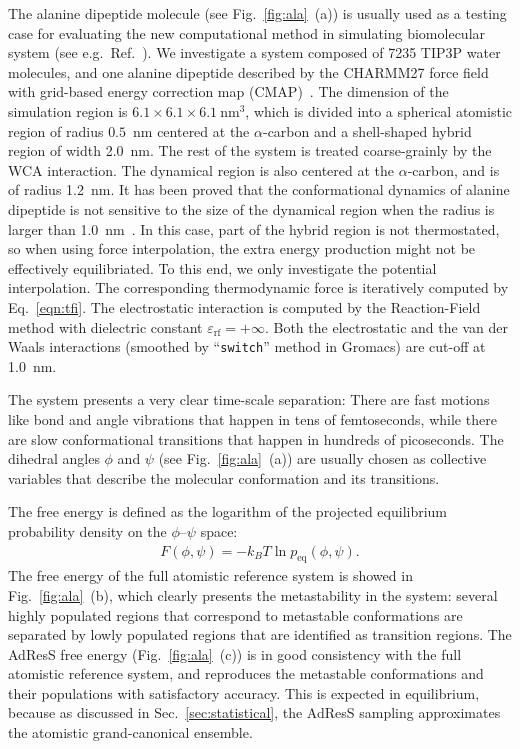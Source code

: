 \documentclass[epjST]{svjour}
\newcommand{\equi}{{\textrm{eq}}}
\begin{document}
The alanine dipeptide molecule (see Fig.~\ref{fig:ala}~(a)) is usually
used as a testing case for evaluating the new computational method in simulating 
biomolecular system (see e.g.~Ref.~\cite{apostolakis1999calculation,chodera2007automatic,kaminsky2007force,gfeller2007complex}).
We investigate a system composed of
7235 TIP3P water molecules, and
one alanine dipeptide described by the CHARMM27 force field~\cite{foloppe2000all} with
grid-based energy correction map (CMAP)~\cite{mackerell2004extending}. 
The dimension of the simulation region is $6.1\times6.1\times6.1~\textrm{nm}^3$, which is divided into
a spherical atomistic region of radius  $0.5$~nm centered at the $\alpha$-carbon and a  shell-shaped hybrid region of width 2.0~nm.
The rest of the system is treated coarse-grainly by the WCA interaction.
The dynamical region  is
also centered at the $\alpha$-carbon, and is of radius 1.2~nm.
It has been proved that the conformational dynamics of alanine dipeptide is not sensitive to the size of
the dynamical region when the radius is larger than 1.0~nm~\cite{wang2014exploring}.
In this case, part of the hybrid region is not thermostated, so
when using force interpolation, the extra energy production might not be effectively equilibriated.
To this end, we only investigate the potential interpolation. The corresponding
thermodynamic force is iteratively computed by
Eq.~\eqref{eqn:tfi}.
The electrostatic interaction is computed by the Reaction-Field method with dielectric constant $\varepsilon_{\textrm{rf}} = +\infty$.
Both the electrostatic and the van der Waals interactions (smoothed by ``\texttt{switch}'' method in Gromacs)
are cut-off at 1.0~nm.

The system presents a very clear time-scale separation: There are fast
motions like bond and angle vibrations that happen in tens of femtoseconds, while
there are slow conformational transitions that happen in hundreds of picoseconds.
The dihedral angles $\phi$ and $\psi$ (see
Fig.~\ref{fig:ala}~(a)) are usually chosen as collective variables that  describe
the molecular conformation and its transitions.

The free energy is defined as the logarithm of the projected equilibrium probability density on the
$\phi$--$\psi$ space:
\begin{align}
  F(\phi,\psi) = -k_BT \ln p_\equi(\phi,\psi).
\end{align}
The free energy of the full atomistic reference system is showed in
Fig.~\ref{fig:ala}~(b), which clearly presents the metastability in the
system: several highly populated regions that correspond to metastable
conformations are separated by lowly populated regions that are
identified as transition regions.
The AdResS free energy (Fig.~\ref{fig:ala}~(c)) is in good
consistency with the full atomistic reference system, and
reproduces the metastable conformations and their populations
with satisfactory accuracy.
This is expected in equilibrium, because as discussed in
Sec.~\ref{sec:statistical}, the AdResS sampling approximates the
atomistic grand-canonical ensemble.
\end{document}
